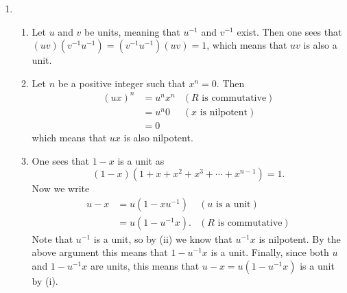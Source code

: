 \begin{enumerate}
    \item \begin{enumerate}[label=(\roman*)]
        \item Let $u$ and $v$ be units, meaning that $u^{-1}$ and $v^{-1}$ exist. Then one sees that $(uv)(v^{-1}u^{-1}) = (v^{-1}u^{-1})(uv) = 1$, which means that $uv$ is also a unit.
        
        \item Let $n$ be a positive integer such that $x^n = 0$. Then
        \begin{align*}
            (ux)^n &= u^nx^n & (R\text{ is commutative})\\
            &= u^n0 & (x \text{ is nilpotent})\\
            &= 0
        \end{align*}
        which means that $ux$ is also nilpotent.

        \item One sees that $1-x$ is a unit as
        \[
            (1-x)(1+x+x^2+x^3+\cdots+x^{n-1}) = 1.    
        \]
        Now we write
        \begin{align*}
            u-x &= u(1-xu^{-1}) & (u \text{ is a unit})\\
            &= u(1-u^{-1}x). & (R \text{ is commutative})
        \end{align*}
        Note that $u^{-1}$ is a unit, so by (ii) we know that $u^{-1}x$ is nilpotent. By the above argument this means that $1-u^{-1}x$ is a unit. Finally, since both $u$ and $1-u^{-1}x$ are units, this means that $u-x = u(1-u^{-1}x)$ is a unit by (i).
    \end{enumerate}
\end{enumerate}

